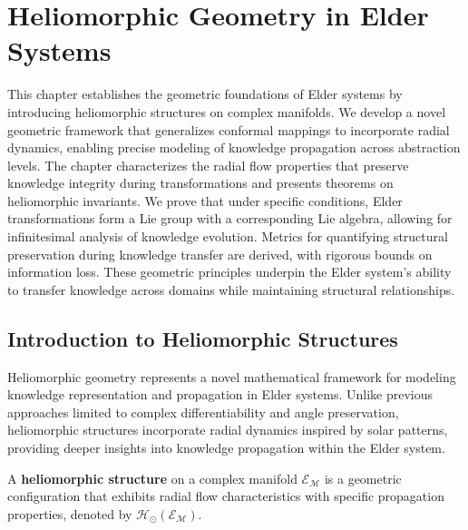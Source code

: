 \chapter{Heliomorphic Geometry in Elder Systems}

\begin{tcolorbox}[colback=blue!5!white,colframe=blue!75!black,title=Chapter Summary]
This chapter establishes the geometric foundations of Elder systems by introducing heliomorphic structures on complex manifolds. We develop a novel geometric framework that generalizes conformal mappings to incorporate radial dynamics, enabling precise modeling of knowledge propagation across abstraction levels. The chapter characterizes the radial flow properties that preserve knowledge integrity during transformations and presents theorems on heliomorphic invariants. We prove that under specific conditions, Elder transformations form a Lie group with a corresponding Lie algebra, allowing for infinitesimal analysis of knowledge evolution. Metrics for quantifying structural preservation during knowledge transfer are derived, with rigorous bounds on information loss. These geometric principles underpin the Elder system's ability to transfer knowledge across domains while maintaining structural relationships.
\end{tcolorbox}

\section{Introduction to Heliomorphic Structures}

Heliomorphic geometry represents a novel mathematical framework for modeling knowledge representation and propagation in Elder systems. Unlike previous approaches limited to complex differentiability and angle preservation, heliomorphic structures incorporate radial dynamics inspired by solar patterns, providing deeper insights into knowledge propagation within the Elder system.

\begin{definition}
A \textbf{heliomorphic structure} on a complex manifold $\mathcal{E}_{\mathcal{M}}$ is a geometric configuration that exhibits radial flow characteristics with specific propagation properties, denoted by $\mathcal{H}_{\odot}(\mathcal{E}_{\mathcal{M}})$.
\end{definition}


